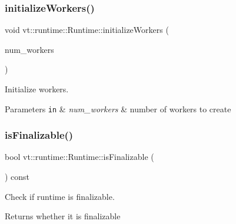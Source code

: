 \subsubsection{\texorpdfstring{initialize\+Workers()}{initializeWorkers()}}
{\footnotesize\ttfamily void vt\+::runtime\+::\+Runtime\+::initialize\+Workers (\begin{DoxyParamCaption}\item[{\hyperlink{namespacevt_aa93398ea48f2cb6c188512250f7cc248}{Worker\+Count\+Type} const}]{num\+\_\+workers }\end{DoxyParamCaption})\hspace{0.3cm}{\ttfamily [protected]}}



Initialize workers. 


\begin{DoxyParams}[1]{Parameters}
\mbox{\tt in}  & {\em num\+\_\+workers} & number of workers to create \\
\hline
\end{DoxyParams}
\mbox{\label{structvt_1_1runtime_1_1_runtime_ab18731a9ecde8e326c0e4aa798ee10c7}} 
\subsubsection{\texorpdfstring{is\+Finalizable()}{isFinalizable()}}
{\footnotesize\ttfamily bool vt\+::runtime\+::\+Runtime\+::is\+Finalizable (\begin{DoxyParamCaption}{ }\end{DoxyParamCaption}) const\hspace{0.3cm}{\ttfamily [inline]}}



Check if runtime is finalizable. 

\begin{DoxyReturn}{Returns}
whether it is finalizable 
\end{DoxyReturn}
\mbox{\label{structvt_1_1runtime_1_1_runtime_af8e30c5de7fabc90fb32ce83018e91c8}} 
